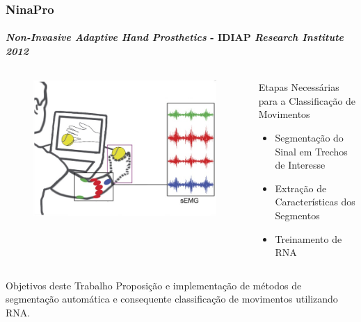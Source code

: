\documentclass{beamer}
\begin{document}
	\begin{frame}
		\frametitle{NinaPro}
		\framesubtitle{\emph{Non-Invasive Adaptive Hand Prosthetics} - IDIAP \emph{Research Institute 2012}}
		
		\begin{columns}[c]
				\begin{figure}
					\begin{center}
						\includegraphics[width=\textwidth]{./img/classificationExample.jpg}
					\end{center}
				\end{figure}
				\begin{alertblock}{Etapas Necessárias para a Classificação de Movimentos}
				\begin{itemize}
					\item Segmentação do Sinal em Trechos de Interesse
					\item Extração de Características dos Segmentos
					\item Treinamento de RNA
				\end{itemize}
			\end{alertblock}
		\end{columns}

		\begin{block}{Objetivos deste Trabalho}
			Proposição e implementação de métodos de segmentação automática e consequente classificação de movimentos utilizando RNA.
		\end{block}

	\end{frame}
\end{document}
